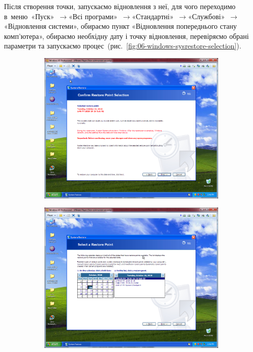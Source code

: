 \documentclass[
	a4paper,
	oneside,
	DIV = 12,
	fontsize = 13pt,
	headings = normal,
]{scrartcl}
\newcommand{\Mytextrightarrow}{$\rightarrow$\hspace{0.25em}}
\begin{document}
			Після створення точки, запускаємо відновлення з неї, для чого переходимо в~меню~«Пуск»~\Mytextrightarrow «Всі програми»~\Mytextrightarrow «Стандартні»~\Mytextrightarrow «Службові»~\Mytextrightarrow «Відновлення системи», обираємо пункт «Відновлення попереднього стану комп'ютера», обираємо необхідну дату і точку відновлення, перевіряємо обрані параметри та запускаємо процес~(рис.~\ref{fig:06-windows-sysrestore-selection}).

			\begin{figure}[!htbp]
				\centering
				\begin{subfigure}{0.5\columnwidth}
					\centering
					\includegraphics[height = 8\baselineskip]{./assets/y03s01-pcdiag-lab-04-p10.png}
					\caption{}
					\label{subfig:06-01-windows-sysrestore-selection-start}
				\end{subfigure}%
				\begin{subfigure}{0.5\columnwidth}
					\centering
					\includegraphics[height = 8\baselineskip]{./assets/y03s01-pcdiag-lab-04-p11.png}

\end{subfigure}
\end{figure}
\end{document}
